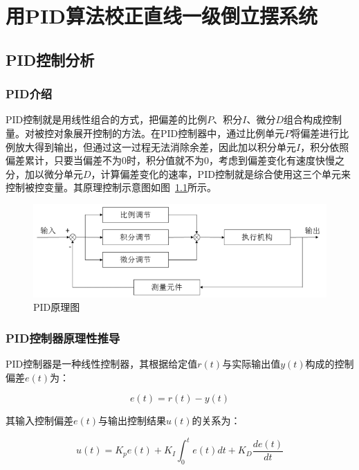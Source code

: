 \chapter{用PID算法校正直线一级倒立摆系统}
\section{PID控制分析}

\subsection{PID介绍}

PID控制就是用线性组合的方式，把偏差的比例$P$、积分$I$、微分$D$组合构成控制量。对被控对象展开控制的方法。在PID控制器中，通过比例单元$P$将偏差进行比例放大得到输出，但通过这一过程无法消除余差，因此加以积分单元$I$，积分依照偏差累计，只要当偏差不为0时，积分值就不为0，考虑到偏差变化有速度快慢之分，加以微分单元$D$，计算偏差变化的速率，PID控制就是综合使用这三个单元来控制被控变量。其原理控制示意图如图~\ref{fig:PID_principle}所示。


\begin{figure}[hbpt]
\centering
\includegraphics[width=12cm]{PID_principle.png}
\caption{PID原理图}\label{fig:PID_principle}
\end{figure}



\subsection{PID控制器原理性推导}
	
PID控制器是一种线性控制器，其根据给定值$r(t)$与实际输出值$y(t)$构成的控制偏差$e(t)$为：

\begin{equation}
e(t)=r(t)-y(t)
\end{equation}

其输入控制偏差$e(t)$与输出控制结果$u(t)$的关系为：

\begin{equation}
u(t)=K_pe(t)+K_I\int_0^te(t)dt+K_D \frac{de(t)}{dt}
\end{equation}

